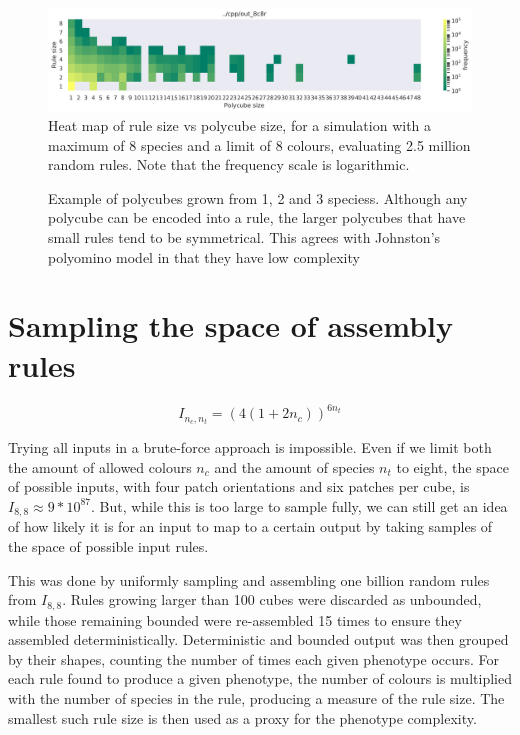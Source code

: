 \begin{figure}
\centering\includegraphics[width=\textwidth]{figures/rs_vs_ps_8c8r.png}
\caption{Heat map of rule size vs polycube size, for a simulation with a maximum of 8 species and a limit of 8 colours, evaluating 2.5 million random rules. Note that the frequency scale is logarithmic.}
\label{fig:rs_vs_ps}\end{figure}

\begin{figure}
\caption{Example of polycubes grown from 1, 2 and 3 speciess. Although any polycube can be encoded into a rule, the larger polycubes that have small rules tend to be symmetrical. This agrees with Johnston's polyomino model in that they have low complexity}
\label{fig:poly_examples}\end{figure}

\section{Sampling the space of assembly rules}

\[
I_{n_c, n_t} = (4(1+2n_c))^{6n_t}
\]

Trying all inputs in a brute-force approach is impossible. Even if we limit both the amount of allowed colours \(n_c\) and the amount of species \(n_t\) to eight, the space of possible inputs, with four patch orientations and six patches per cube, is \(I_{8, 8} \approx 9*10^{87}\).
But, while this is too large to sample fully, we can still get an idea of how likely it is for an input to map to a certain output by taking samples of the space of possible input rules.

This was done by uniformly sampling and assembling one billion random rules from \(I_{8, 8}\). Rules growing larger than 100 cubes were discarded as unbounded, while those remaining bounded were re-assembled 15 times to ensure they assembled deterministically. Deterministic and bounded output was then grouped by their shapes, counting the number of times each given phenotype occurs. For each rule found to produce a given phenotype, the number of colours is multiplied with the number of species in the rule, producing a measure of the rule size. The smallest such rule size is then used as a proxy for the phenotype complexity.

